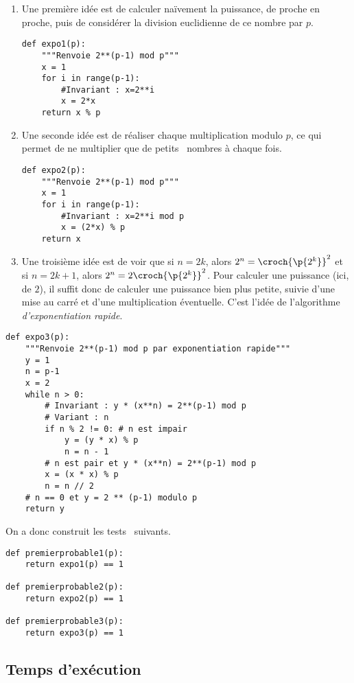 \begin{enumerate}
  \item Une première idée est de calculer naïvement la puissance, de proche en proche, puis de considérer la division euclidienne de ce nombre par $p$.
\begin{lstlisting}
def expo1(p):
    """Renvoie 2**(p-1) mod p"""
    x = 1
    for i in range(p-1):
    	#Invariant : x=2**i
        x = 2*x
    return x % p
\end{lstlisting}
  \item Une seconde idée est de réaliser chaque multiplication modulo $p$, ce qui permet de ne multiplier que de \og petits \fg\ nombres à chaque fois. 
\begin{lstlisting}
def expo2(p):
    """Renvoie 2**(p-1) mod p"""
    x = 1
    for i in range(p-1):
    	#Invariant : x=2**i mod p
        x = (2*x) % p
    return x  
\end{lstlisting}
  \item Une troisième idée est de voir que si $n = 2k$, alors $2^n = \croch{\p{2^k}}^2$ et si $n = 2k+1$, alors $2^n = 2\croch{\p{2^k}}^2$. 
  Pour calculer une puissance (ici, de $2$), il suffit donc de calculer une puissance bien plus petite, suivie d'une mise au carré et d'une multiplication éventuelle. C'est l'idée de l'algorithme \emph{d'exponentiation rapide}.

\end{enumerate}
\begin{lstlisting}
def expo3(p):
    """Renvoie 2**(p-1) mod p par exponentiation rapide"""
    y = 1
    n = p-1
    x = 2
    while n > 0:
        # Invariant : y * (x**n) = 2**(p-1) mod p
        # Variant : n
        if n % 2 != 0: # n est impair
            y = (y * x) % p
            n = n - 1
        # n est pair et y * (x**n) = 2**(p-1) mod p
        x = (x * x) % p
        n = n // 2
    # n == 0 et y = 2 ** (p-1) modulo p
    return y
\end{lstlisting}


On a donc construit les \og tests \fg\ suivants.

\begin{lstlisting}
def premierprobable1(p):
    return expo1(p) == 1

def premierprobable2(p):
    return expo2(p) == 1

def premierprobable3(p):
    return expo3(p) == 1
\end{lstlisting}

\subsection{Temps d'exécution}

